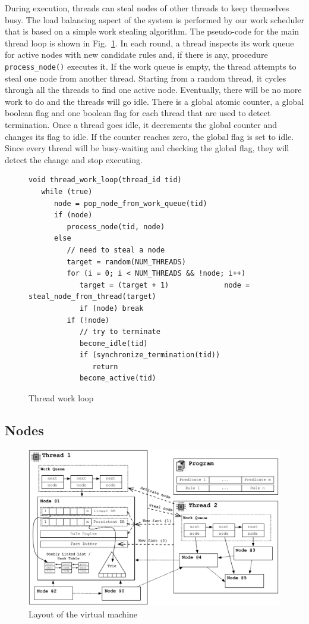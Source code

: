 \documentclass{sigplanconf}
\begin{document}
During execution, threads can steal nodes of other threads to keep
themselves busy. The load balancing aspect of the system is performed
by our work scheduler that is based on a simple work stealing
algorithm. The pseudo-code for the main thread loop is shown in
Fig.~\ref{code:work_loop}. In each round, a thread inspects its work
queue for active nodes with new candidate rules and, if there is any,
procedure \texttt{process\_node()} executes it. If the work queue is
empty, the thread attempts to steal one node from another
thread. Starting from a random thread, it cycles through all the
threads to find one active node. Eventually, there will be no more
work to do and the threads will go idle. There is a global atomic
counter, a global boolean flag and one boolean flag for each thread
that are used to detect termination. Once a thread goes idle, it
decrements the global counter and changes its flag to idle. If the
counter reaches zero, the global flag is set to idle. Since every
thread will be busy-waiting and checking the global flag, they will
detect the change and stop executing.

\begin{figure}[ht]
{\footnotesize
\begin{Verbatim}
void thread_work_loop(thread_id tid)
   while (true)
      node = pop_node_from_work_queue(tid)
      if (node)
         process_node(tid, node)
      else
         // need to steal a node
         target = random(NUM_THREADS)
         for (i = 0; i < NUM_THREADS && !node; i++)
            target = (target + 1)             node = steal_node_from_thread(target)
            if (node) break
         if (!node)
            // try to terminate
            become_idle(tid)
            if (synchronize_termination(tid))
               return
            become_active(tid)
\end{Verbatim}
}
\caption{Thread work loop}
\label{code:work_loop}
\end{figure}


\subsection{Nodes}

\begin{figure}[t]
\centering
\includegraphics[width=\textwidth]{figures/overview.pdf}
\caption{Layout of the virtual machine}
\label{fig:overview}
\end{figure}
\end{document}
